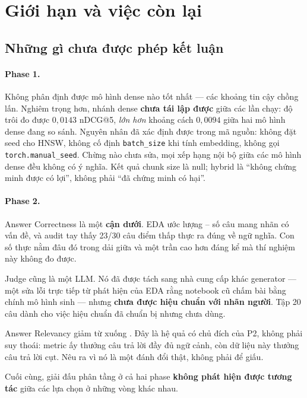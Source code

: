 \section{Giới hạn và việc còn lại}

\subsection{Những gì chưa được phép kết luận}

\paragraph{Phase 1.}
Không phân định được mô hình dense nào tốt nhất --- các khoảng tin cậy chồng
lấn. Nghiêm trọng hơn, nhánh dense \textbf{chưa tái lập được} giữa các lần
chạy: độ trôi đo được $0{,}0143$ nDCG@5, \emph{lớn hơn} khoảng cách $0{,}0094$
giữa hai mô hình dense đang so sánh. Nguyên nhân đã xác định được trong mã
nguồn: không đặt seed cho HNSW, không cố định \texttt{batch\_size} khi tính
embedding, không gọi \texttt{torch.manual\_seed}. Chừng nào chưa sửa, mọi xếp
hạng nội bộ giữa các mô hình dense đều không có ý nghĩa. Kết quả chunk size là
null; hybrid là ``không chứng minh được có lợi'', không phải ``đã chứng minh có
hại''.

\paragraph{Phase 2.}
Answer Correctness \NumHoAC{} là một \textbf{cận dưới}. EDA ước lượng
\NumNoiseFloor{}--\NumNoiseCeiling{} số câu mang nhãn có vấn đề, và audit tay
thấy 23/30 câu điểm thấp thực ra đúng về ngữ nghĩa. Con số thực nằm đâu đó
trong dải giữa \NumHoAC{} và một trần cao hơn đáng kể mà thí nghiệm này không
đo được.

Judge cũng là một LLM. Nó đã được tách sang nhà cung cấp khác generator --- một
sửa lỗi trực tiếp từ phát hiện của EDA rằng notebook cũ chấm bài bằng chính mô
hình sinh --- nhưng \textbf{chưa được hiệu chuẩn với nhãn người}. Tập 20 câu
dành cho việc hiệu chuẩn đã chuẩn bị nhưng chưa dùng.

Answer Relevancy giảm từ \NumDevAnsRel{} xuống \NumHoAnsRel{}. Đây là hệ quả có
chủ đích của P2, không phải suy thoái: metric ấy thưởng câu trả lời đầy đủ ngữ
cảnh, còn dữ liệu này thưởng câu trả lời cụt. Nêu ra vì nó là một đánh đổi thật,
không phải để giấu.

Cuối cùng, giải đấu phân tầng ở cả hai phase \textbf{không phát hiện được tương
tác} giữa các lựa chọn ở những vòng khác nhau.

